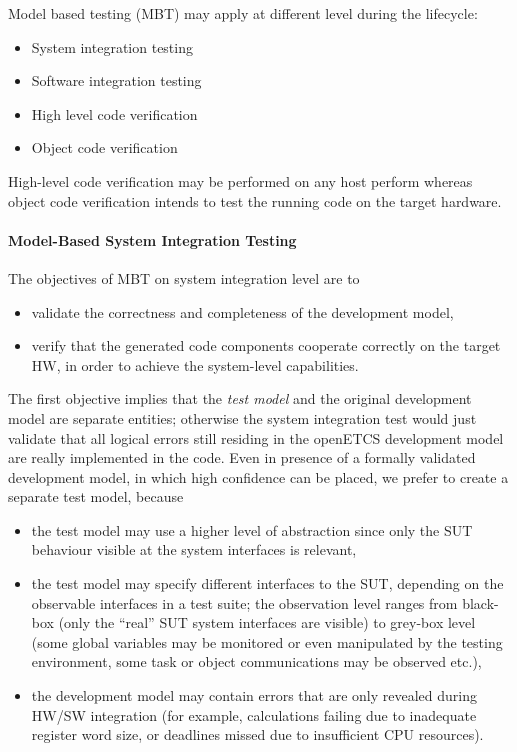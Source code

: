 Model based testing (MBT) may apply at different level during the
lifecycle:
\begin{itemize}
\item System integration testing
\item Software integration testing
\item High level code verification
\item Object code verification
\end{itemize}
High-level code verification may be performed on any host perform
whereas object code verification intends to test the running code on
the target hardware.

\paragraph{Model-Based System Integration Testing}
The objectives of MBT on system integration level are to
\begin{itemize}
\item validate the correctness and completeness of the development model,
\item verify that the generated code components cooperate correctly on
  the target HW, in order to achieve the system-level capabilities.
\end{itemize}

The first objective implies that the {\it test model} and the original
development model are separate entities; otherwise the system
integration test would just validate that all logical errors still
residing in the openETCS development model are really implemented in
the code. Even in presence of a formally validated development model,
in which high confidence can be placed, we prefer to create a separate
test model, because
\begin{itemize}
\item the test model may use a higher level of abstraction since only
  the SUT behaviour visible at the system interfaces is relevant,

\item the test model may specify different interfaces to the SUT,
  depending on the observable interfaces in a test suite; the
  observation level ranges from black-box (only the ``real'' SUT
  system interfaces are visible) to grey-box level (some global
  variables may be monitored or even manipulated by the testing
  environment, some task or object communications may be observed
  etc.),

\item the development model may contain errors that are only revealed
  during HW/SW integration (for example, calculations failing due to
  inadequate register word size, or deadlines missed due to
  insufficient CPU resources).
\end{itemize}

